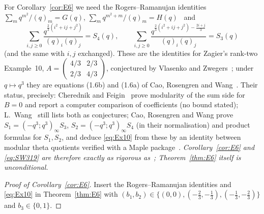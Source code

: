 \documentclass[11pt]{amsart}
\theoremstyle{definition}
\numberwithin{equation}{section}
\begin{document}
For Corollary~\ref{cor:E6} we need the Rogers--Ramanujan identities
$\sum_mq^{m^2}/(q)_m=G(q)$, $\sum_mq^{m^2+m}/(q)_m=H(q)$~\cite{Rogers,AndrewsBook} and
\begin{equation}\label{eq:Ex10}
\sum_{i,j\ge0}\frac{q^{\frac23(i^2+ij+j^2)}}{(q)_i(q)_j}=S_4(q),\qquad
\sum_{i,j\ge0}\frac{q^{\frac23(i^2+ij+j^2)-\frac{2i+j}3}}{(q)_i(q)_j}=S_3(q)
\end{equation}
(and the same with $i,j$ exchanged). These are the identities for Zagier's rank-two Example~10,
$A=\left(\begin{smallmatrix}4/3&2/3\\2/3&4/3\end{smallmatrix}\right)$, conjectured by Vlasenko and
Zwegers~\cite[Table~1]{VZ}; under $q\mapsto q^3$ they are equations (1.6b) and (1.6a) of Cao, Rosengren and
Wang~\cite{CRW}. Their status, precisely: Cherednik and Feigin~\cite[around (2.20)]{CF} prove modularity of
the sum side for $B=0$ and report a computer comparison of coefficients (no bound stated); L.~Wang~\cite[§3.10]{Wang22}
still lists both as conjectures; Cao, Rosengren and Wang prove $S_1=(-q^3;q^3)_\infty S_3$,
$S_2=(-q^3;q^3)_\infty S_4$ (in their normalisation) and product formulas for $S_1,S_2$, and deduce
\eqref{eq:Ex10} from these by an identity between modular theta quotients verified with a Maple
package~\cite[Theorem~1.4]{CRW}. \emph{Corollary~\ref{cor:E6} and \eqref{eq:SW319} are therefore exactly as
rigorous as~\cite[Theorem~1.4]{CRW}; Theorem~\ref{thm:E6} itself is unconditional.}

\begin{proof}[Proof of Corollary~\ref{cor:E6}]
Insert the Rogers--Ramanujan identities and \eqref{eq:Ex10} in Theorem~\ref{thm:E6} with
$(b_1,b_2)\in\{(0,0),(-\frac23,-\frac13),(-\frac13,-\frac23)\}$ and $b_3\in\{0,1\}$.
\end{proof}
\end{document}
